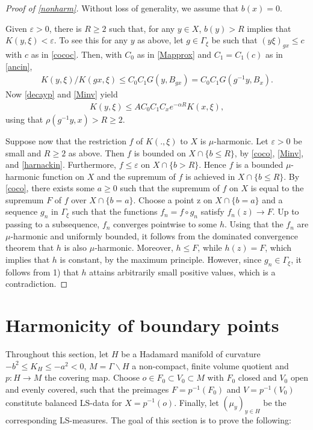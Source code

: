 \documentclass[12pt,a4paper]{amsart}
\newcounter{alph}
\numberwithin{equation}{section}
\theoremstyle{definition}
\def\ve{\varepsilon}
\begin{document}
\begin{proof}[Proof of \cref{nonharm}]
Without loss of generality, we assume that $b(x)=0$.
 
Given $\ve>0$, there is $R\geq 2$ such that, for any $y\in X$, $b(y)>R$ implies that $K(y,\xi)<\ve$. To see this for any $y$ as above, let $g\in \Gamma_\xi$ be such that $(y\xi)_{gx}\leq c$ with $c$ as in \cref{cococ}.
Then, with $C_0$ as in \eqref{Mapprox} and $C_1=C_1(c)$ as in \ref{ancin},
\begin{align*}
    K(y,\xi)/K(gx,\xi) \le C_0 C_1 G(y,B_{gx}) = C_0 C_1 G(g^{-1}y,B_x).
\end{align*}
Now \ref{decayp} and \cref{Minv} yield
\begin{align*}
    K(y,\xi)\le AC_0C_1C_x e^{-\alpha R}K(x,\xi),    
\end{align*}
using that $\rho(g^{-1}y,x)>R\geq2$.

Suppose now that the restriction $f$ of $K(. ,\xi)$ to $X$ is $\mu$-harmonic.
Let $\ve>0$ be small and $R\ge2$ as above.
Then $f$ is bounded on $X\cap\{b\le R\}$, by \cref{coco}, \cref{Minv}, and \ref{harnackin}.
Furthermore, $f\le\ve$ on $X\cap\{b>R\}$.
Hence $f$ is a bounded $\mu$-harmonic function on $X$ and the supremum of $f$ is achieved in $X\cap\{b\le R\}$.
By \cref{coco}, there exists some $a\ge0$ such that the supremum of $f$ on $X$ is equal to the supremum $F$ of $f$ over $X \cap \{ b = a \}$.
Choose a point z on $X \cap \{ b = a \}$ and a sequence $g_n$ in $\Gamma_\xi$ such that the functions $f_n = f \circ g_n$ satisfy $f_n(z)\to F$.
Up to passing to a subsequence, $f_n$ converges pointwise to some $h$.
Using that the $f_n$ are $\mu$-harmonic and uniformly bounded, it follows from the dominated convergence theorem that $h$ is also $\mu$-harmonic.
Moreover, $h\leq F$, while $h(z) = F$, which implies that $h$ is constant, by the maximum principle.
However, since $g_n\in\Gamma_\xi$, it follows from 1) that $h$ attains arbitrarily small positive values, which is a contradiction.
\end{proof}

\section{Harmonicity of boundary points}\label{secharm}

Throughout this section, let $H$ be a Hadamard manifold of  curvature $-b^2 \leq K_H \leq -a^2 < 0$, $M = \Gamma \backslash H$ a non-compact, finite volume quotient and $p \colon H \to M$ the covering map. Choose $o \in F_0 \subset V_0 \subset M$ with $F_0$ closed and $V_0$ open and evenly covered, such that the preimages $F = p^{-1}(F_0)$ and $V = p^{-1}(V_0)$ constitute balanced LS-data for $X = p^{-1}(o)$. Finally, let $(\mu_y)_{y \in H}$ be the corresponding LS-measures. The goal of this section is to prove the following:
\end{document}
